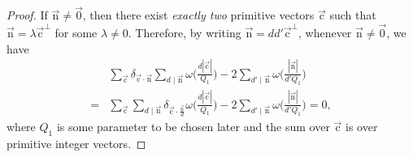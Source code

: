 \documentclass[letterpaper,11pt]{amsart}
\numberwithin{equation}{section}
\theoremstyle{definition}
\numberwithin{equation}{section}
\newcommand{\uc}{{\vec{\mathrm{c}}}}
\newcommand{\nn}{\vec{\mathrm{n}}}
\begin{document}
\begin{proof}
	If $\nn\not=\vec{0}$, then there exist \emph{exactly two} primitive vectors $\uc$ such that  $\nn=\lambda\uc^\perp$ for some $\lambda \neq 0$. Therefore, by writing $\nn =dd'\uc^\perp$, whenever $\nn\not=\vec{0}$,  we have 
	\begin{align}\label{eq:first identity}&\sum_{\uc}\delta_{\uc\cdot \nn}\sum_{d\mid \nn}\omega\Big(\frac{d|\uc|}{Q_1}\Big)-2\sum_{d'\mid \nn}\omega\Big(\frac{|\nn|}{d'Q_1}\Big)\\=&\sum_{\uc}\sum_{d\mid \nn}\delta_{\uc\cdot \frac{\nn}{d}}\omega\Big(\frac{d|\uc|}{Q_1}\Big)-2\sum_{d'\mid \nn}\omega\Big(\frac{|\nn|}{d'Q_1}\Big)=0,\nonumber
	\end{align}
	where $Q_1$ is some parameter to be chosen later and the sum over $\uc$ is over primitive integer vectors.


\end{proof}
\end{document}
